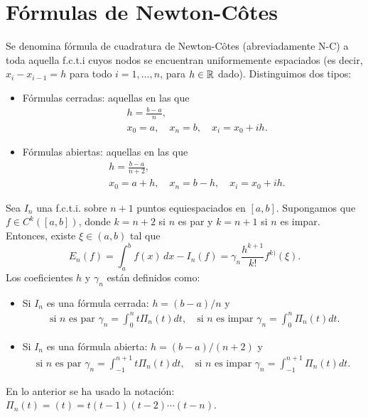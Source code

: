 \section{Fórmulas de Newton-Côtes}
\label{sec:formulas-de-newton}

\begin{definition}
  \label{def:1}
  Se denomina fórmula de cuadratura de Newton-Côtes (abreviadamente
  N-C) a toda aquella f.c.t.i cuyos nodos se encuentran
  uniformemente espaciados (es decir, $x_{i}-x_{i-1}=h$ para todo
  $i=1,\dots,n$, para $h\in\operatorname{{\mathbb R}}$ dado). Distinguimos dos tipos:
  \begin{itemize}
  \item Fórmulas cerradas: aquellas en las que
    \begin{align*}
      &h=\frac{b-a}{n}, \\
      &x_0=a, \quad x_n=b, \quad x_i=x_0 + i h.
    \end{align*}
  \item Fórmulas abiertas: aquellas en las que
    \begin{align*}
      &h=\frac{b-a}{n+2}, \\
      &x_0=a+h, \quad x_n=b- h, \quad x_i=x_0 + i h.
    \end{align*}
  \end{itemize}
\end{definition}

\begin{theorem}
  \label{thm:error.formulas-nc}
  Sea $I_n$ una f.c.t.i. sobre $n+1$ puntos equiespaciados en
  $[a,b]$. Supongamos que $f\in C^k([a,b])$, donde $k=n+2$ si $n$ es par
  y $k=n+1$ si $n$ es impar. Entonces, existe $\xi\in(a,b)$ tal que
  \begin{equation}
    \label{eq:error-formulas-nc}
    E_n(f)=\int_a^bf(x)\,dx - I_n(f)
    = \gamma_n \frac{h^{k+1}}{k!}f^{k)}(\xi).
  \end{equation}
  Los coeficientes $h$ y $\gamma_n$ están definidos como:
  \begin{itemize}
  \item Si $I_n$ es una fórmula cerrada: $h=(b-a)/n$ y
    \begin{align*}
      \text{ si $n$ es par }
      \gamma_n=\int_0^n t \Pi_n(t) dt,
      \quad \text{si $n$ es impar }
      \gamma_n=\int_0^n \Pi_n(t) dt.
    \end{align*}
  \item Si $I_n$ es una fórmula abierta: $h=(b-a)/(n+2)$ y
    \begin{align*}
      \text{si $n$ es par }
      \gamma_n=\int_{-1}^{n+1} t \Pi_n(t) dt,
      \quad \text{si $n$ es impar }
      \gamma_n=\int_{-1}^{n+1} \Pi_n(t) dt.
    \end{align*}
  \end{itemize}
  En lo anterior se ha usado la notación:
  $\Pi_n(t)=(t)=t(t-1)(t-2)\cdots (t-n)$.
\end{theorem}

